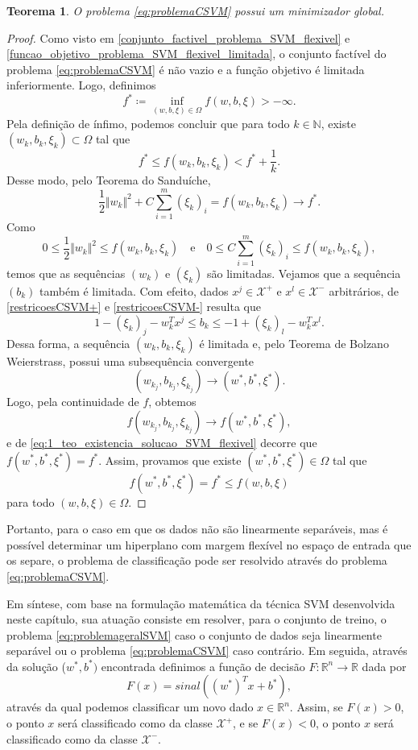 \documentclass[12pt,a4paper]{scrartcl}
\def\Xset{\mathcal{X}}
\def\RR{\mathds{R}}
\newtheorem{teo}{Teorema}
\theoremstyle{definition}%
\begin{document}
\begin{teo} \label{teo:unicidade_solucao_problema_SVM_flexivel}
O problema \eqref{eq:problemaCSVM} possui um minimizador global.
\end{teo}
\begin{proof}
Como visto em \eqref{conjunto_factivel_problema_SVM_flexivel} e \eqref{funcao_objetivo_problema_SVM_flexivel_limitada}, o conjunto factível do problema \eqref{eq:problemaCSVM} é não vazio e a função objetivo é limitada inferiormente. Logo, definimos
\[
f^{*} \coloneqq \inf_{(w,b,\xi) \in \Omega} f(w,b,\xi) > -\infty.
\]
Pela definição de ínfimo, podemos concluir que para todo $k\in \mathds{N}$, existe $(w_{k}, b_{k}, \xi_{k}) \subset \Omega $ tal que
\[
f^{*} \leq f(w_{k}, b_{k}, \xi_{k}) < f^{*} + \dfrac{1}{k} .
\]
Desse modo, pelo Teorema do Sanduíche, 
\[ \label{eq:1_teo_existencia_solucao_SVM_flexivel}
\dfrac{1}{2} \Vert w_{k} \Vert^{2} + C\sum_{i=1}^{m} (\xi_{k})_{i} = f(w_{k}, b_{k}, \xi_{k}) \rightarrow f^{*} .
\]
Como
\[
0\leq \dfrac{1}{2} \Vert w_{k} \Vert^{2} \leq f(w_{k}, b_{k}, \xi_{k}) \quad \text{e} \quad 0 \leq C\sum_{i=1}^{m} (\xi_{k})_{i} \leq f(w_{k}, b_{k}, \xi_{k}) ,
\]
temos que as sequências $(w_{k})$ e $(\xi_{k})$ são limitadas. Vejamos que a sequência $(b_{k})$ também é limitada. Com efeito, dados $x^{j} \in \Xset^{+}$ e $x^{l} \in \Xset^{-}$ arbitrários, de \eqref{restricoesCSVM+} e \eqref{restricoesCSVM-} resulta que 
\[
1 - (\xi_{k})_{j} - w_{k}^{T} x^{j} \leq b_{k} \leq -1 + (\xi_{k})_{l} - w_{k}^{T} x^{l} .
\]
Dessa forma, a sequência $(w_{k}, b_{k}, \xi_{k})$ é limitada e, pelo Teorema de Bolzano Weierstrass, possui uma subsequência convergente 
\[
(w_{k_{j}}, b_{k_{j}}, \xi_{k_{j}}) \rightarrow  (w^{*}, b^{*}, \xi^{*}) .
\]
Logo, pela continuidade de $f$, obtemos
\[
f(w_{k_{j}}, b_{k_{j}}, \xi_{k_{j}}) \rightarrow  f(w^{*}, b^{*}, \xi^{*}) ,
\]
e de \eqref{eq:1_teo_existencia_solucao_SVM_flexivel} decorre que $f(w^{*}, b^{*}, \xi^{*}) = f^{*}$. Assim, provamos que existe $(w^{*}, b^{*}, \xi^{*}) \in \Omega$ tal que
\[
f(w^{*}, b^{*}, \xi^{*}) = f^{*} \leq f(w, b, \xi)
\]
para todo $(w, b, \xi) \in \Omega$.
\end{proof}

Portanto, para o caso em que os dados não são linearmente separáveis, mas é possível determinar um hiperplano com margem flexível no espaço de entrada que os separe, o problema de classificação pode ser resolvido através do problema \eqref{eq:problemaCSVM}.

Em síntese, com base na formulação matemática da técnica SVM desenvolvida neste capítulo, sua atuação consiste em resolver, para o conjunto de treino, o problema \eqref{eq:problemageralSVM} caso o conjunto de dados seja linearmente separável ou o problema \eqref{eq:problemaCSVM} caso contrário. Em seguida, através da solução ($w^{*}, b^{*})$ encontrada definimos a função de decisão $F: \RR^{n} \rightarrow \RR$ dada por
\[
F(x) = sinal((w^{*})^{T} x + b^{*}),
\]
através da qual podemos classificar um novo dado $x\in \RR^{n}$. Assim, se $F(x) >0$, o ponto $x$ será classificado como da classe $\Xset^{+}$, e se $F(x)<0$, o ponto $x$ será classificado como da classe $\Xset^{-}$.
\end{document}
